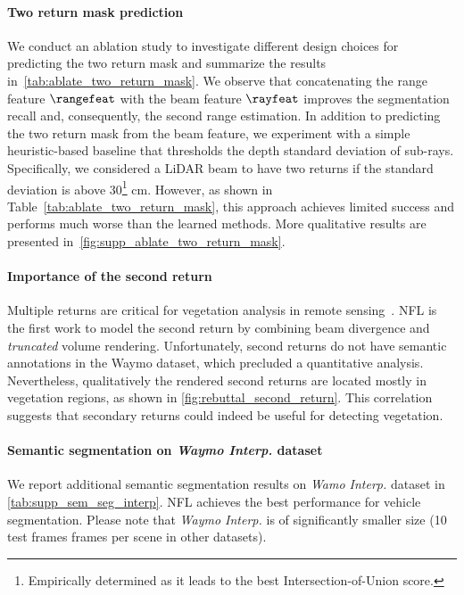 \paragraph{Two return mask prediction}

We conduct an ablation study to investigate different design choices for predicting the two return mask and summarize the results in~\cref{tab:ablate_two_return_mask}. We observe that concatenating the range feature $\rangefeat$ with the beam feature $\rayfeat$ improves the segmentation recall and, consequently, the second range estimation. In addition to predicting the two return mask from the beam feature, we experiment with a simple heuristic-based baseline that thresholds the depth standard deviation of sub-rays. Specifically, we considered a LiDAR beam to have two returns if the standard deviation is above 30\footnote{Empirically determined as it leads to the best Intersection-of-Union score.} cm. However, as shown in Table~\ref{tab:ablate_two_return_mask}, this approach achieves limited success and performs much worse than the learned methods. More qualitative results are presented in~\cref{fig:supp_ablate_two_return_mask}. 

\paragraph{Importance of the second return}
Multiple returns are critical for vegetation analysis in remote sensing~\cite{lim2003lidar}. NFL is the first work to model the second return by combining beam divergence and \textit{truncated} volume rendering. Unfortunately, second returns do not have semantic annotations in the Waymo dataset, which precluded a quantitative analysis. Nevertheless, qualitatively the rendered second returns are located mostly in vegetation regions, as shown in \cref{fig:rebuttal_second_return}. This correlation suggests that secondary returns could indeed be useful for detecting vegetation. 


\paragraph{Semantic segmentation on \textit{Waymo Interp.} dataset}

We report additional semantic segmentation results on \textit{Wamo Interp.} dataset in \cref{tab:supp_sem_seg_interp}. NFL achieves the best performance for vehicle segmentation. Please note that \textit{Waymo Interp.} is of significantly smaller size (10 test frames  frames per scene in other datasets).

